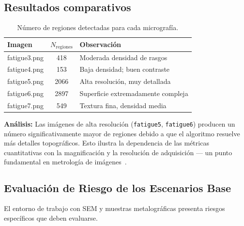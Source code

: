 \documentclass[12pt,a4paper]{article}
\begin{document}
\subsection{Resultados comparativos}

\begin{table}[H]
	\centering
	\caption{Número de regiones detectadas para cada micrografía.}
	\label{tab:regiones}
	\begin{tabular}{l S[table-format=4.0] l}
		\toprule
		\textbf{Imagen} & {$N_\mathrm{regiones}$} & \textbf{Observación}               \\
		\midrule
		fatigue3.png    & 418                     & Moderada densidad de rasgos        \\
		fatigue4.png    & 153                     & Baja densidad; buen contraste      \\
		fatigue5.png    & 2066                    & Alta resolución, muy detallada     \\
		fatigue6.png    & 2897                    & Superficie extremadamente compleja \\
		fatigue7.png    & 549                     & Textura fina, densidad media       \\
		\bottomrule
	\end{tabular}
\end{table}

\textbf{Análisis:} Las imágenes de alta resolución (\texttt{fatigue5},
\texttt{fatigue6}) producen un número significativamente mayor de regiones
debido a que el algoritmo resuelve más detalles topográficos.  Esto
ilustra la dependencia de las métricas cuantitativas con la magnificación
y la resolución de adquisición --- un punto fundamental en metrología de
imágenes~\cite{russ2016}.

\subsection{Evaluación de Riesgo de los Escenarios Base}
\label{sec:riesgo_base}

El entorno de trabajo con SEM y muestras metalográficas presenta riesgos
específicos que deben evaluarse.
\end{document}
